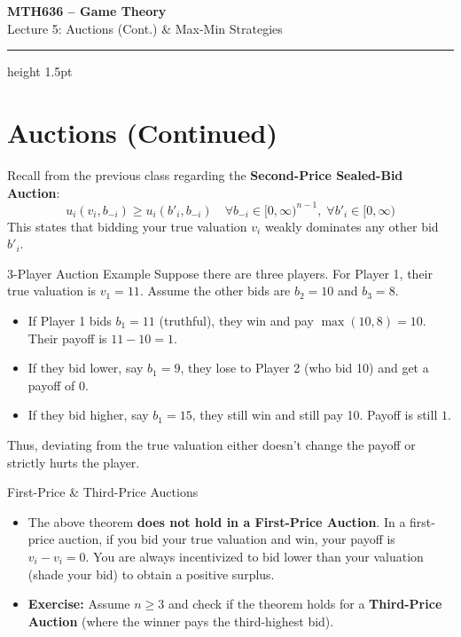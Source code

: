 \documentclass[12pt, a4paper]{article}
\begin{document}
\begin{center}
  {\LARGE\bfseries\sffamily\color{defblue} MTH636 -- Game Theory}\\[6pt]
  {\Large\sffamily Lecture 5: Auctions (Cont.) \& Max-Min Strategies}\\[4pt]
\end{center}
\vspace{0.5cm}
\hrule height 1.5pt
\vspace{0.3cm}

\section{Auctions (Continued)}

Recall from the previous class regarding the \textbf{Second-Price Sealed-Bid Auction}:
\[
  u_i(v_i, b_{-i}) \geq u_i(b'_i, b_{-i}) \quad \forall b_{-i} \in [0, \infty)^{n-1}, \; \forall b'_i \in [0, \infty)
\]
This states that bidding your true valuation $v_i$ weakly dominates any other bid $b'_i$.

\begin{exbox}{3-Player Auction Example}
  Suppose there are three players. For Player 1, their true valuation is $v_1 = 11$.
  Assume the other bids are $b_2 = 10$ and $b_3 = 8$.
  \begin{itemize}
      \item If Player 1 bids $b_1 = 11$ (truthful), they win and pay $\max(10, 8) = 10$. Their payoff is $11 - 10 = 1$.
      \item If they bid lower, say $b_1 = 9$, they lose to Player 2 (who bid 10) and get a payoff of $0$.
      \item If they bid higher, say $b_1 = 15$, they still win and still pay 10. Payoff is still $1$.
  \end{itemize}
  Thus, deviating from the true valuation either doesn't change the payoff or strictly hurts the player.
\end{exbox}

\begin{warnbox}{First-Price \& Third-Price Auctions}
  \begin{itemize}
      \item The above theorem \textbf{does not hold in a First-Price Auction}. In a first-price auction, if you bid your true valuation and win, your payoff is $v_i - v_i = 0$. You are always incentivized to bid lower than your valuation (shade your bid) to obtain a positive surplus.
      \item \textbf{Exercise:} Assume $n \geq 3$ and check if the theorem holds for a \textbf{Third-Price Auction} (where the winner pays the third-highest bid).
  \end{itemize}
\end{warnbox}
\end{document}
